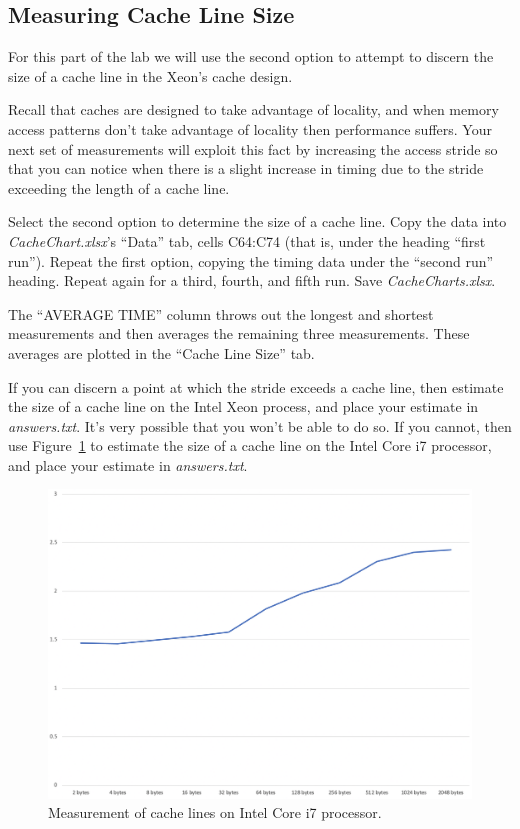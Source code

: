 \subsection{Measuring Cache Line Size}

For this part of the lab we will use the second option to attempt to discern the
size of a cache line in the Xeon's cache design.

Recall that caches are designed to take advantage of locality, and when memory
access patterns don't take advantage of locality then performance suffers. Your
next set of measurements will exploit this fact by increasing the access stride
so that you can notice when there is a slight increase in timing due to the
stride exceeding the length of a cache line.

Select the second option to determine the size of a cache line. Copy the data
into \textit{CacheChart.xlsx}'s ``Data'' tab, cells C64:C74 (that is, under the
heading ``first run''). Repeat the first option, copying the timing data under
the ``second run'' heading. Repeat again for a third, fourth, and fifth run.
Save \textit{CacheCharts.xlsx}.

The ``AVERAGE TIME'' column throws out the longest and shortest measurements
and then averages the remaining three measurements. These averages are plotted
in the ``Cache Line Size'' tab.

If you can discern a point at which the stride exceeds a cache line, then
estimate the size of a cache line on the Intel Xeon process, and place your
estimate in \textit{answers.txt}. It's very possible that you won't be able to
do so. If you cannot, then use Figure~\ref{fig:LaptopCacheLine} to estimate the
size of a cache line on the Intel Core i7 processor, and place your estimate in
\textit{answers.txt}.

\begin{figure}
    \centering
    \includegraphics[width=13cm]{IntelI7cacheLine}
    \caption{Measurement of cache lines on Intel Core i7 processor. \label{fig:LaptopCacheLine}}
\end{figure}

